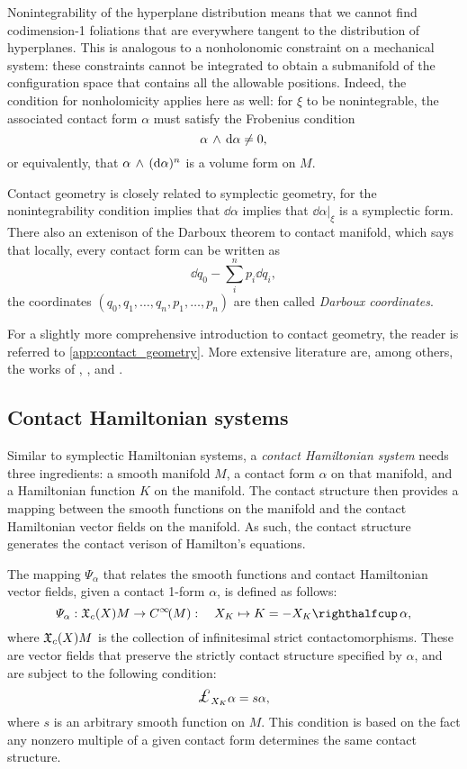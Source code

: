 Nonintegrability of the hyperplane distribution means that we cannot find codimension-1 foliations that are everywhere tangent to the distribution of hyperplanes. This is analogous to a nonholonomic constraint on a mechanical system: these constraints cannot be integrated to obtain a submanifold of the configuration space that contains all the allowable positions. Indeed, the condition for nonholomicity applies here as well: for $\xi$ to be nonintegrable, the associated contact form $\alpha$ must satisfy the Frobenius condition 
$$  \alpha\,\wedge\,\dd{\alpha}  \neq 0, $$
or equivalently, that $ \alpha\,\wedge\,(\dd{\alpha})^n $ is a volume form on $M$. 

Contact geometry is closely related to symplectic geometry, for the nonintegrability condition implies that $\dd{\alpha}$ implies that $\dd{\alpha}\vert_{\xi}$ is a symplectic form. There also an extenison of the Darboux theorem to contact manifold, which says that locally, every contact form can be written as
\begin{equation}
    \dd{q}_0 - \sum_i^n p_i \dd{q}_i, 
    \label{eq:contact_darboux}
\end{equation} 
the coordinates $(q_0, q_1, \ldots, q_n, p_1, \ldots, p_n)$ are then called \emph{Darboux coordinates}.

For a slightly more comprehensive introduction to contact geometry, the reader is referred to \cref{app:contact_geometry}. More extensive literature are, among others, the works of \citet{Geiges2008}, \citet{Libermann1987}, \citet{Arnold1989,Arnold1989a} and \citet{Godbillon1969}.

\subsection{Contact Hamiltonian systems}
Similar to symplectic Hamiltonian systems, a \emph{contact Hamiltonian system} needs three ingredients: a smooth manifold $M$, a contact form $\alpha$ on that manifold, and a Hamiltonian function $K$ on the manifold. The contact structure then provides a mapping between the smooth functions on the manifold and the contact Hamiltonian vector fields on the manifold. As such, the contact structure generates the contact verison of Hamilton's equations.

The mapping $\Psi_\alpha$ that relates the smooth functions and contact Hamiltonian vector fields, given a contact 1-form $\alpha$, is defined as follows:
\begin{equation}
    \Psi_\alpha: \vsfields{c}{X}{M} \to \functions{M}: \quad X_K \mapsto K = -\intpr{X_K}{\alpha}, 
    \label{eq:psi_definition}
\end{equation}
where $\mathfrak{X}_{c}\qty(X){M}$ is the collection of infinitesimal strict contactomorphisms. These are vector fields that preserve the strictly contact structure specified by $\alpha$, and are subject to the following condition:
\begin{equation}
    \lied{X_K}{\alpha} = s \alpha, 
    \label{eq:contact_vf_condition}
\end{equation}
where $s$ is an arbitrary smooth function on $M$. This condition is based on the fact any nonzero multiple of a given contact form determines the same contact structure.

